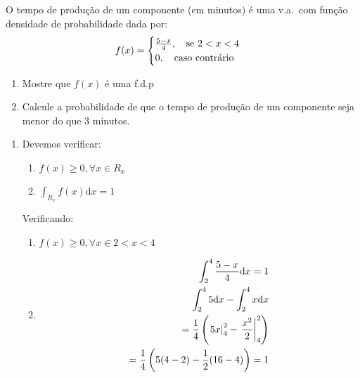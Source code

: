      \begin{example}
       O tempo de produção de um componente (em minutos) é uma v.a.\ com função densidade 
       de probabilidade dada por: 
       \begin{align}
         f(x)=
         \begin{cases}
           \frac{5-x}{4}, \text{\quad se $2<x<4$}\\
           0,\text{\quad caso contrário} 
         \end{cases}
       \end{align}
       \begin{enumerate}[label=(\alph*)]
         \item Mostre que $f(x)$ é uma f.d.p
         \item Calcule a probabilidade de que o tempo de produção de um componente 
           seja menor do que 3 minutos.
       \end{enumerate}
       \begin{enumerate}[label=(\alph*)]
         \item Devemos verificar: 
           \begin{enumerate}[leftmargin=*, label=\roman*., widest=IV, align=left] %
             \item $f(x)\geq 0, \forall x \in R_{x}$
             \item $\int_{R_{x}} f(x)\mathrm{d}x=1$
           \end{enumerate}

           Verificando:
           \begin{enumerate}[leftmargin=*, label=\roman*., widest=IV, align=left] %
             \item $f(x)\geq 0, \forall x \in  2<x<4$
             \item 
               \begin{align*}
                 \int_{2}^4 \frac{5-x}{4}\mathrm{d}x=1\\
                 \int_{2}^4 5 \mathrm{d}x - \int_{2}^4 x \mathrm{d}x  \\
                 = \frac{1}{4}  \left(\left.5x\right\rvert_{4}^{2} - \left.\frac{x^2}{2}\right\rvert_{4}^{2}\right) \\
                 = \frac{1}{4} \left(5(4-2)- \frac{1}{2}(16-4) \right)= 1
               \end{align*}


\end{enumerate}
\end{enumerate}
\end{example}
